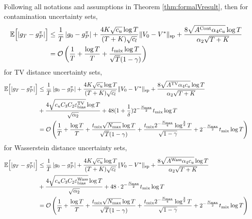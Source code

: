 \begin{theorem} \label{thm:formalgresult}
    Following all notations and assumptions in Theorem \ref{thm:formalVresult}, then for contamination uncertainty sets,
    \begin{align} 
        \mathbb{E}\Bigl[\left | g_{T}-g^\pi_{\mathcal{P}} \right |\Bigr] &\leq\frac{1}{T}\left | g_0-g^\pi_{\mathcal{P}} \right | + \frac{4K \sqrt{c_u}\log T}{(T+K)\sqrt{c_l}} \|V_0 - V^*\|_{\mathrm{sp}} + \frac{8 \sqrt{A^{\mathrm{Cont}}\alpha_4 c_u}\log T}{\alpha_2\sqrt{T+K}}\\
        &=\operatorname*{\mathcal{O}}\left(\frac{1}{T}+\frac{\log T}{T}+\frac{t_{\mathrm{mix}}\log T}{\sqrt{T}(1-\gamma)}\right)
    \end{align}
    for TV distance uncertainty sets,
    \begin{align} 
        \mathbb{E}\Bigl[\left | g_{T}-g^\pi_{\mathcal{P}} \right |\Bigr] &\leq\frac{1}{T}\left | g_0-g^\pi_{\mathcal{P}} \right | + \frac{4K \sqrt{c_u}\log T}{(T+K)\sqrt{c_l}} \|V_0 - V^*\|_{\mathrm{sp}} + \frac{8\sqrt{A^{\mathrm{TV}} \alpha_4 c_u}\log T}{\alpha_2\sqrt{T+K}} \nonumber\\
        &+ \frac{4\sqrt{c_u C_3 C_2 \varepsilon^{\mathrm{TV}}_{\mathrm{bias}}}\log T }{\sqrt{\alpha_2}} + 48(1+\frac{1}{\delta}) 2^{-\frac{N_{\max}}{2}}t_{\mathrm{mix}} \log T\\
        &=\operatorname*{\mathcal{O}}\left(\frac{1}{T}+\frac{\log T}{T}+\frac{t_{\mathrm{mix}}\sqrt{N_{\max}}\log T}{\sqrt{T}(1-\gamma)} + \frac{t_{\mathrm{mix}}  2^{-\frac{N_{\max}}{4}}\log^{\frac{3}{2}} T}{\sqrt{1-\gamma}} +  2^{-\frac{N_{\max}}{2}}t_{\mathrm{mix}} \log T\right)
    \end{align}
    for Wasserstein distance uncertainty sets,
    \begin{align} 
        \mathbb{E}\Bigl[\left | g_{T}-g^\pi_{\mathcal{P}} \right |\Bigr] &\leq \frac{1}{T}\left | g_0-g^\pi_{\mathcal{P}} \right | +\frac{4K \sqrt{c_u} \log T}{(T+K)\sqrt{c_l}} \|V_0 - V^*\|_{\mathrm{sp}} + \frac{8 \sqrt{A^{\mathrm{Wass}} \alpha_4 c_u} \log T}{\alpha_2\sqrt{T+K}} \nonumber\\
        &+ \frac{4\sqrt{c_u C_3 C_2 \varepsilon^{\mathrm{Wass}}_{\mathrm{bias}}} \log T}{\sqrt{\alpha_2}} + 48\cdot2^{-\frac{N_{\max}}{2}}t_{\mathrm{mix}} \log T\\
        &=\operatorname*{\mathcal{O}}\left(\frac{1}{T}+\frac{\log T}{T}+\frac{t_{\mathrm{mix}}\sqrt{N_{\max}}\log T}{\sqrt{T}(1-\gamma)} + \frac{t_{\mathrm{mix}}  2^{-\frac{N_{\max}}{4}}\log^{\frac{3}{2}} T}{\sqrt{1-\gamma}} +  2^{-\frac{N_{\max}}{2}}t_{\mathrm{mix}} \log T\right)
    \end{align}
\end{theorem}
